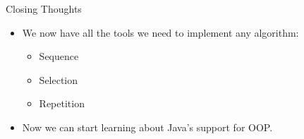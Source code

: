 \documentclass{beamer}
\begin{document}
\begin{frame}[fragile]{Closing Thoughts}


\begin{itemize}
\item We now have all the tools we need to implement any algorithm:
\begin{itemize}
\item Sequence
\item Selection
\item Repetition
\end{itemize}
\item Now we can start learning about Java's support for OOP.
\end{itemize}


\end{frame}
\end{document}
